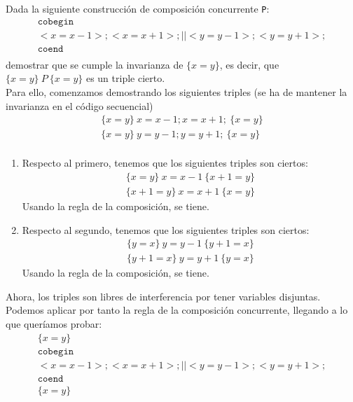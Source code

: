 \begin{ejercicio}
    Dada la siguiente construcción de composición concurrente \verb|P|:
    \begin{gather*}
        \texttt{cobegin} \\
        <x=x-1>;<x=x+1>;||<y=y-1>;<y=y+1>; \\
        \texttt{coend} \\
    \end{gather*}
    demostrar que se cumple la invarianza de $\{x=y\}$, es decir, que $\{x=y\}\ P\ \{x=y\}$ es un triple cierto.\\

Para ello, comenzamos demostrando los siguientes triples (se ha de mantener la invarianza en el código secuencial)
\begin{gather*}
    \{x=y\}\ x=x-1;x=x+1;\ \{x=y\} \\
    \{x=y\}\ y=y-1;y=y+1;\ \{x=y\} \\
\end{gather*}
\begin{enumerate}
    \item Respecto al primero, tenemos que los siguientes triples son ciertos:
        \begin{gather*}
            \{x=y\}\ x=x-1\ \{x+1=y\} \\
            \{x+1=y\}\ x=x+1\ \{x=y\}
        \end{gather*}
        Usando la regla de la composición, se tiene.
    \item Respecto al segundo, tenemos que los siguientes triples son ciertos:
        \begin{gather*}
            \{y=x\}\ y=y-1\ \{y+1=x\} \\
            \{y+1=x\}\ y=y+1\ \{y=x\}
        \end{gather*}
        Usando la regla de la composición, se tiene.
\end{enumerate}
Ahora, los triples son libres de interferencia por tener variables disjuntas. Podemos aplicar por tanto la regla de la composición concurrente, llegando a lo que queríamos probar:
\begin{gather*}
    \{x=y\} \\
    \texttt{cobegin} \\
    <x=x-1>;<x=x+1>;||<y=y-1>;<y=y+1>; \\
    \texttt{coend} \\
    \{x=y\}
\end{gather*}
\end{ejercicio}

